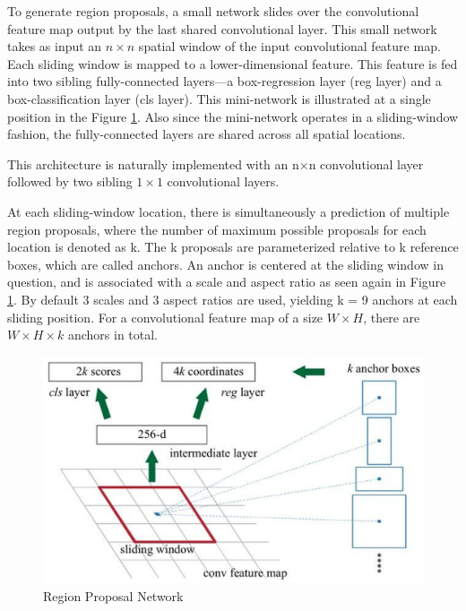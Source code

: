 To generate region proposals, a small network slides over the convolutional feature map output by the last shared convolutional layer. This small
network takes as input an $n \times n$ spatial window of the input convolutional feature map. Each sliding window is mapped to a lower-dimensional feature.
This feature is fed into two sibling fully-connected layers—a box-regression layer (reg layer) and a box-classification layer (cls layer). This mini-network 
is illustrated at a single position in the Figure \ref{fig:anchors}. Also since the mini-network operates in a sliding-window fashion, the 
fully-connected layers are shared across all spatial locations. 

This architecture is naturally implemented with an n×n convolutional layer followed by two sibling $1 \times 1$ convolutional layers. 

\newpage
At each sliding-window 
location, there is simultaneously a prediction of multiple region proposals, where the number of maximum possible proposals for each location is
denoted as k. The k proposals are parameterized relative to k reference boxes, which are called  anchors. An anchor is centered at the sliding window
in question, and is associated with a scale and aspect ratio as seen again in Figure \ref{fig:anchors}. By default 3 scales and 3 aspect ratios are used, 
yielding k = 9 anchors at each sliding position. For a convolutional feature map of a size $W \times H$, there are $W \times H \times k$ anchors in total.

\begin{figure}
    \centering
    \includegraphics[scale=0.1]{Figures/anchors.jpeg}
    \caption{Region Proposal Network}
    \label{fig:anchors}
\end{figure}


